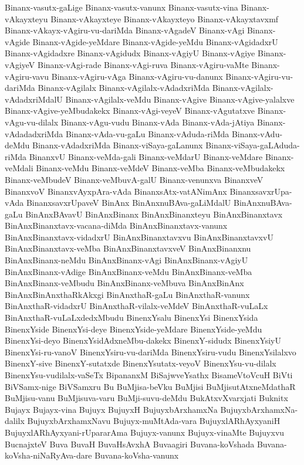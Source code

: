 {Binanx-vasutx-gaLige
Binanx-vasutx-vanunx
Binanx-vasutx-vina
Binanx-vAkayxteyu
Binanx-vAkayxteye
Binanx-vAkayxteyo
Binanx-vAkayxtavxmf
Binanx-vAkayx-vAgiru-vu-dariMda
Binanx-vAgadeV
Binanx-vAgi
Binanx-vAgide
Binanx-vAgide-yeMdare
Binanx-vAgide-yeMdu
Binanx-vAgidadxrU
Binanx-vAgidadxre
Binanx-vAgidudx
Binanx-vAgiyU
Binanx-vAgiye
Binanx-vAgiyeV
Binanx-vAgi-rade
Binanx-vAgi-ruva
Binanx-vAgiru-vaMte
Binanx-vAgiru-vavu
Binanx-vAgiru-vAga
Binanx-vAgiru-vu-danunx
Binanx-vAgiru-vu-dariMda
Binanx-vAgilalx
Binanx-vAgilalx-vAdadxriMda
Binanx-vAgilalx-vAdadxriMdalU
Binanx-vAgilalx-veMdu
Binanx-vAgive
Binanx-vAgive-yalalxve
Binanx-vAgive-yeMbudakekx
Binanx-vAgi-veyeV
Binanx-vAgutatxve
Binanx-vAgu-vu-dilalx
Binanx-vAgu-vudu
Binanx-vAda
Binanx-vAda-jAtiya
Binanx-vAdadadxriMda
Binanx-vAda-vu-gaLu
Binanx-vAduda-riMda
Binanx-vAdu-deMdu
Binanx-vAdadxriMda
Binanx-viSaya-gaLanunx
Binanx-viSaya-gaLAduda-riMda
BinanxvU
Binanx-veMda-gali
Binanx-veMdarU
Binanx-veMdare
Binanx-veMdali
Binanx-veMdu
Binanx-veMdeV
Binanx-veMba
Binanx-veMbudakekx
Binanx-veMbudeV
Binanx-veMbuvA-galU
Binanx-venunxva
BinanxveV
BinanxvoV
BinanxvAyxpAra-vAda
BinanxsAtx-vatANimAnx
BinanxsavxrUpa-vAda
BinanxsavxrUpaveV
BinAnx
BinAnxnuBAva-gaLiMdalU
BinAnxnuBAva-gaLu
BinAnxBAvavU
BinAnxBinanx
BinAnxBinanxteyu
BinAnxBinanxtavx
BinAnxBinanxtavx-vacana-diMda
BinAnxBinanxtavx-vanunx
BinAnxBinanxtavx-vidadxrU
BinAnxBinanxtavxvu
BinAnxBinanxtavxvU
BinAnxBinanxtavx-veMba
BinAnxBinanxtavxveV
BinAnxBinanxnu
BinAnxBinanx-neMdu
BinAnxBinanx-vAgi
BinAnxBinanx-vAgiyU
BinAnxBinanx-vAdige
BinAnxBinanx-veMdu
BinAnxBinanx-veMba
BinAnxBinanx-veMbudu
BinAnxBinanx-veMbuva
BinAnxBinAnx
BinAnxBinAnxthaRkAkxgi
BinAnxthaR-gaLu
BinAnxthaR-vanunx
BinAnxthaR-vidadxrU
BinAnxthaR-vilalx-veMdeV
BinAnxthaR-vuLaLx
BinAnxthaR-vuLaLxdedxMbudu
BinenxYsalu
BinenxYsi
BinenxYsida
BinenxYside
BinenxYsi-deye
BinenxYside-yeMdare
BinenxYside-yeMdu
BinenxYsi-deyo
BinenxYsidAdxneMbu-dakekx
BinenxY-sidudx
BinenxYsiyU
BinenxYsi-ru-vanoV
BinenxYsiru-vu-dariMda
BinenxYsiru-vudu
BinenxYsilalxvo
BinenxY-sive
BinenxY-sutatxde
BinenxYsutatx-veyoV
BinenxYsu-vu-dilalx
BinenxYsu-vudilalx-vaSeTx
BipananxM
BiSajwveYsathx
BisameVtoVcuH
BiVti
BiVSamx-nige
BiVSamxru
Bu
BuMjisa-beVku
BuMjisi
BuMjisutAtxneMdathaR
BuMjisu-vanu
BuMjisuva-varu
BuMji-suvu-deMdu
BukAtxvXvarxjati
Buknitx
Bujayx
Bujayx-vina
Bujuyx
BujuyxH
BujuyxbArxhamxNa
BujuyxbArxhamxNa-dalilx
BujuyxbArxhamxNavu
Bujuyx-muMtAda-vara
BujuyxlARhAyxyaniH
BujuyxlARhAyxyani-rUpararAma
Bujuyx-vanunx
Bujuyx-vinaMte
Bujuyxvu
BucnajxteV
Buva
BuvaH
BuvaHsAvxhA
Buvaagiri
Buvana-koVshada
Buvana-koVsha-niNaRyAva-dare
Buvana-koVsha-vanunx
}

